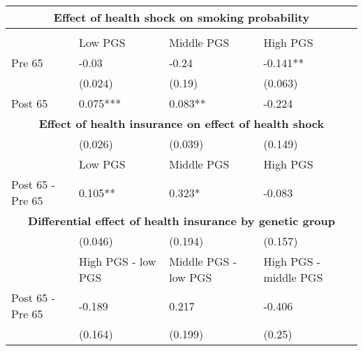 % 
\begin{tabular}{llll}
  \toprule
  \multicolumn{4}{c}{ \textbf{Effect of health shock on smoking probability}} \\
 \midrule
 &  &  &  \\ 
   \midrule
 & Low PGS & Middle PGS & High PGS \\ 
  Pre 65 & -0.03 & -0.24 & -0.141** \\ 
   & (0.024) & (0.19) & (0.063) \\ 
  Post 65 & 0.075*** & 0.083** & -0.224 \\ 
   \toprule \multicolumn{4}{c}{ \textbf{Effect of health insurance on effect of health shock}} \\
 \midrule
 & (0.026) & (0.039) & (0.149) \\ 
   \midrule
 & Low PGS & Middle PGS & High PGS \\ 
  Post 65 - Pre 65 & 0.105** & 0.323* & -0.083 \\ 
   \toprule \multicolumn{4}{c}{ \textbf{Differential effect of health insurance by genetic group}} \\
 \midrule
 & (0.046) & (0.194) & (0.157) \\ 
   \midrule
 & High PGS - low PGS & Middle PGS - low PGS & High PGS - middle PGS \\ 
  Post 65 - Pre 65 & -0.189 & 0.217 & -0.406 \\ 
   & (0.164) & (0.199) & (0.25) \\ 
  \end{tabular}
